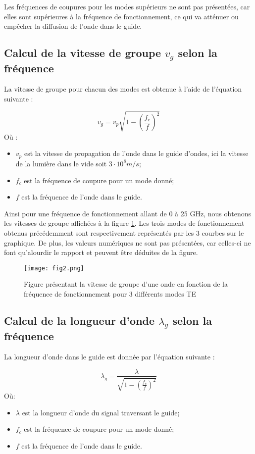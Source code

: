 Les fréquences de coupures pour les modes supérieurs ne sont pas présentées, car elles sont supérieures à la fréquence de fonctionnement, ce qui va atténuer ou empêcher la diffusion de l'onde dans le guide.

\subsection{Calcul de la vitesse de groupe $v_g$ selon la fréquence}
La vitesse de groupe pour chacun des modes est obtenue à l'aide de l'équation suivante :

\begin{equation}
	v_g = v_p\sqrt{1-\left(\frac{f_c}{f}\right)^2}
\end{equation}
Où :
\begin{itemize}
	\item $v_p$ est la vitesse de propagation de l'onde dans le guide d'ondes, ici la vitesse de la lumière dans le vide soit $3\cdot10^8m/s$;
	\item $f_c$ est la fréquence de coupure pour un mode donné;
	\item $f$ est la fréquence de l'onde dans le guide.
\end{itemize}


Ainsi pour une fréquence de fonctionnement allant de 0 à 25 GHz, nous obtenons les vitesses de groupe affichées à la figure \ref{fig1}. Les trois modes de fonctionnement obtenus précédemment sont respectivement représentés par les 3 courbes sur le graphique. De plus, les valeurs numériques ne sont pas présentées, car celles-ci ne font qu'alourdir le rapport et peuvent être déduites de la figure.

\begin{figure}[htbp]
    \centering
    \texttt{[image: fig2.png]}
    \caption{Figure présentant la vitesse de groupe d'une onde en fonction de la fréquence de fonctionnement pour 3 différents modes TE}
    \label{fig1}
\end{figure}

\subsection{Calcul de la longueur d'onde $\lambda_g$ selon la fréquence}
La longueur d'onde dans le guide est donnée par l'équation suivante :

\begin{equation}
	\lambda_g = \frac{\lambda}{\sqrt{1-\left(\frac{f_c}{f}\right)^2}}
\end{equation}
Où:
\begin{itemize}
	\item $\lambda$ est la longueur d'onde du signal traversant le guide; 
	\item $f_c$ est la fréquence de coupure pour un mode donné;
	\item $f$ est la fréquence de l'onde dans le guide.
\end{itemize}


